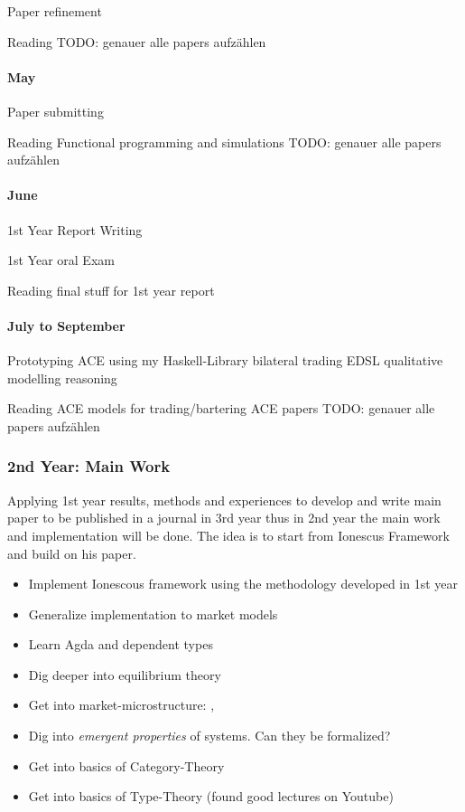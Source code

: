 Paper
	refinement
	
Reading
	TODO: genauer alle papers aufzählen
	
\paragraph{May}
Paper
	submitting

Reading
	Functional programming and simulations
	TODO: genauer alle papers aufzählen
	
\paragraph{June}
1st Year Report
	Writing

1st Year oral Exam

Reading
	final stuff for 1st year report
	
\paragraph{July to September}
Prototyping ACE using my Haskell-Library
	bilateral trading
	EDSL
	qualitative modelling
	reasoning 
	
Reading
	ACE models for trading/bartering
	ACE papers
	TODO: genauer alle papers aufzählen
	
\subsubsection{2nd Year: Main Work}
Applying 1st year results, methods and experiences to develop and write main paper to be published in a journal in 3rd year thus in 2nd year the main  work and implementation will be done. The idea is to start from Ionescus Framework \cite{Botta20114025} and build on his paper.

\begin{itemize}
\item Implement Ionescous framework using the methodology developed in 1st year
\item Generalize implementation to market models
\item Learn Agda and dependent types
\item Dig deeper into equilibrium theory 
\item Get into market-microstructure: \cite{LehalleLaruelle2013}, \cite{baker_market_2013}
\item Dig into \textit{emergent properties} of systems. Can they be formalized?
\item Get into basics of Category-Theory \cite{Pierce1991} \cite{spivak_category_2014}
\item Get into basics of Type-Theory (found good lectures on Youtube)

\end{itemize}

